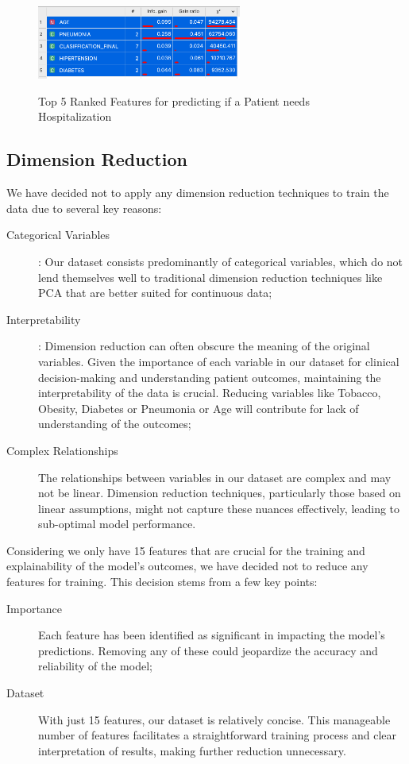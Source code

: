\begin{figure}[H]%
    \caption{Top 5 Ranked Features for predicting if a Patient needs Hospitalization}%
    \label{fig:feat_rank_5}%
    \centering
    {\includegraphics[width=0.6\textwidth]{img/datapreparation/feat_rank_5.png} }
\end{figure}

\subsection{Dimension Reduction}

We have decided not to apply any dimension reduction 
techniques to train the data due to several key reasons:
\begin{description}
    \item[Categorical Variables]: Our dataset consists 
    predominantly of categorical variables, which do not lend 
    themselves well to traditional dimension reduction 
    techniques like PCA that are better suited for continuous 
    data;
    \item[Interpretability]: Dimension reduction can often 
    obscure the meaning of the original variables. Given the 
    importance of each variable in our dataset for clinical 
    decision-making and understanding patient outcomes, 
    maintaining the interpretability of the data is crucial.
    Reducing variables like Tobacco, Obesity, Diabetes or 
    Pneumonia or Age will contribute for lack of understanding
    of the outcomes;
    \item[Complex Relationships]The relationships between 
    variables in our dataset are complex and may not be 
    linear. Dimension reduction techniques, particularly 
    those based on linear assumptions, might not capture 
    these nuances effectively, leading to sub-optimal
    model performance.
\end{description}

Considering we only have 15 features that are crucial for the 
training and explainability of the model's outcomes, we have 
decided not to reduce any features for training. This decision 
stems from a few key points:
\begin{description}
    \item[Importance] Each feature has been identified as 
    significant in impacting the model’s predictions. Removing 
    any of these could jeopardize the accuracy and reliability 
    of the model;
    \item[Dataset] With just 15 features, our dataset is 
    relatively concise. This manageable number of features 
    facilitates a straightforward training process and clear
    interpretation of results, making further reduction 
    unnecessary.
\end{description}
    
